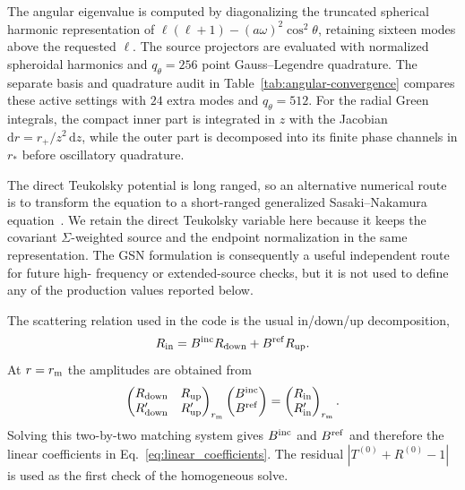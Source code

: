 \documentclass[aps,prd,twocolumn,10pt,nofootinbib,superscriptaddress,floatfix]{revtex4-2}
\newcommand{\dd}{\mathrm{d}}
\newcommand{\Bin}{B^{\rm inc}}
\newcommand{\Bref}{B^{\rm ref}}
\begin{document}
The angular eigenvalue is computed by diagonalizing the truncated spherical
harmonic representation of
$\ell(\ell+1)-(a\omega)^2\cos^2\theta$, retaining sixteen modes above
the requested $\ell$.  The source projectors are evaluated with normalized
spheroidal harmonics and $q_\theta=256$ point Gauss--Legendre quadrature.  The
separate basis and quadrature audit in Table~\ref{tab:angular-convergence}
compares these active settings with $24$ extra modes and $q_\theta=512$.  For the radial Green
integrals, the compact inner part is integrated in $z$ with the Jacobian
$\dd r=r_+/z^2\,\dd z$, while the outer part is decomposed into its finite
phase channels in $r_*$ before oscillatory quadrature.

The direct Teukolsky potential is long ranged, so an alternative numerical
route is to transform the equation to a short-ranged generalized
Sasaki--Nakamura equation~\cite{Hughes2000,Lo2023}.  We retain the direct
Teukolsky variable here because it keeps the covariant $\Sigma$-weighted
source and the endpoint normalization in the same representation.  The GSN
formulation is consequently a useful independent route for future high-
frequency or extended-source checks, but it is not used to define any of the
production values reported below.

The scattering relation used in the code is the usual in/down/up decomposition,
\begin{equation}
R_{\rm in}=\Bin R_{\rm down}+\Bref R_{\rm up}.
\label{eq:smatrix}
\end{equation}
At $r=r_{\rm m}$ the amplitudes are obtained from
\begin{equation}
\begin{pmatrix}
R_{\rm down} & R_{\rm up}\\
R_{\rm down}' & R_{\rm up}'
\end{pmatrix}_{r_{\rm m}}
\begin{pmatrix}\Bin\\ \Bref\end{pmatrix}
=
\begin{pmatrix}R_{\rm in}\\ R_{\rm in}'\end{pmatrix}_{r_{\rm m}} .
\label{eq:matching_matrix}
\end{equation}
Solving this two-by-two matching system gives $\Bin$ and $\Bref$ and therefore
the linear coefficients in Eq.~\eqref{eq:linear_coefficients}.  The residual
$|T^{(0)}+R^{(0)}-1|$ is used as the first check of the homogeneous solve.
\end{document}
